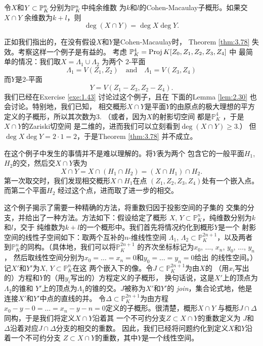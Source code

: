\begin{thm}
\label{thm:3.78}
令$X$和$Y\subset \P_K^n$分别为$\P_K^n$中纯余维数
为$k$和$l$的Cohen-Macaulay子概形。如果交$X\cap Y$
余维数为$k+l$，则
\[
	\deg(X\cap Y)=\deg X\deg Y.
\]
\end{thm}


\begin{exa}\label{exa:3.79}
正如我们指出的，在没有假设$X$和$Y$是Cohen-Macaulay时，
Theorem \ref{thm:3.78} 失效。考察这样一个例子是有益的。
考虑 $\mathbb P_K^4=\proj K[Z_0,Z_1,Z_2,Z_3,Z_4]$ 中
最简单的情况：我们取$X=\Lambda_1\cup \Lambda_2$ 为两个
$2$-平面
\[
	\Lambda_1=V(Z_1,Z_2)\quad \text{and}\quad
	\Lambda_1=V(Z_3,Z_4)
\]
而$Y$是$2$-平面
\[
	Y=V(Z_1-Z_3,Z_2-Z_4).
\]
我们已经在Exercise \ref{exe:1.43} 讨论过这个例子，且在
下面的Lemma \ref{lem:2.30} 也会讨论。特别地，我们已知，
相交概形$X\cap Y$是平面$Y$的由原点的极大理想的平方
定义的子概形，所以其次数为$3$. （或者，因为$X$的射影切空间
都是$\mathbb P_K^4$ \nottran ，于是$X\cap Y$的Zariski切空间
是二维的，进而我们可以立刻看到$\deg(X\cap Y)\geq 3$.）
但$\deg X\deg Y=2\cdot 1=2$，于是Theorem \ref{thm:3.78} 并不成立。
\end{exa}

在这个例子中发生的事情并不是难以理解的。将$Y$表为两个
包含它的一般平面$H_1$, $H_2$的交，然后交$X\cap Y$表为
\[
	X\cap Y=X\cap(H_1\cap H_2)=(X\cap H_1)\cap H_2.
\]
第一次取交时，我们发现相交概形$X\cap H_1$在点
$(Z_1,Z_2,Z_3,Z_4)$处有一个嵌入点。而第二个平面$H_2$
经过这个点，进而取了进一步的相交。 

\vspace{1ex}

这个例子揭示了需要一种精确的方法，将重数归因于投影空间的子集的
交集的分支，并给出了一种方法。方法如下：假设给定了概形
$X$, $Y\subset \mathbb P_K^n$，纯维数分别为$k$和$l$，交于
纯维数为$k+l$的一个概形中。我们首先将情况约化到概形$Y$是一个
射影空间的线性子空间如下：取两个互补的$n$-维线性空间
$\Lambda_1$, $\Lambda_2\subset \mathbb P_K^{2n+1}$，以及两者
到$\mathbb P_K^n$的同构。（具体地，我们可以将$\mathbb P_K^{2n+1}$
的齐次坐标标记为$x_0$, $\dots$, $x_n$, $y_0$, $\dots$, $y_n$，
然后取线性空间分别为$x_0=\dots=x_n=0$和$y_0=\dots=y_n=0$给出
的线性空间。）记$X'$和$Y'$为$X$, $Y\subset \mathbb P_K^n$在这
两个嵌入下的像。令$J\subset \mathbb P_K^{2n+1}$为由$X$的
（用$x_i$写出的）方程和$Y$的（用$y_i$写出的）方程定义的子概形，
换句话说，这是$X'$上的顶点为$\Lambda_2$的锥和
$Y'$上的顶点为$\Lambda_1$的锥的交。$J$被称为$X'$和$Y'$的
\textit{join}，集合论式地，他是连接$X'$和$Y'$中点的直线的并。
令$\Delta\subset \mathbb P_K^{2n+1}$为由方程
$x_0-y-0=\dots=x_n-y-n=0$定义的子概形。很清楚，概形$X\cap Y$
与概形$J\cap \Delta$同构，于是我们将定义$X\cap Y$沿着其
一个不可约分支$Z\subset X\cap Y$的重数定义为
$J$和$\Delta$沿着对应$J\cap \Delta$分支的相交的重数。
因此，我们已经将问题约化到定义$X$和$Y$沿着一个不可约分支
$Z\subset X\cap Y$的重数，其中$Y$是一个线性空间。


